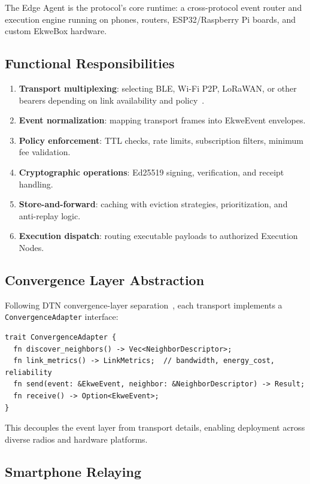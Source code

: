 \documentclass[11pt,a4paper]{article}
\begin{document}
The Edge Agent is the protocol's core runtime: a cross-protocol event router and execution engine running on phones, routers, ESP32/Raspberry Pi boards, and custom EkweBox hardware.

\subsection{Functional Responsibilities}

\begin{enumerate}[nosep]
  \item \textbf{Transport multiplexing}: selecting BLE, Wi-Fi P2P, LoRaWAN, or other bearers depending on link availability and policy~\cite{wifi_p2p}.
  \item \textbf{Event normalization}: mapping transport frames into EkweEvent envelopes.
  \item \textbf{Policy enforcement}: TTL checks, rate limits, subscription filters, minimum fee validation.
  \item \textbf{Cryptographic operations}: Ed25519 signing, verification, and receipt handling.
  \item \textbf{Store-and-forward}: caching with eviction strategies, prioritization, and anti-replay logic.
  \item \textbf{Execution dispatch}: routing executable payloads to authorized Execution Nodes.
\end{enumerate}

\subsection{Convergence Layer Abstraction}

Following DTN convergence-layer separation~\cite{rfc4838}, each transport implements a \texttt{ConvergenceAdapter} interface:

\begin{lstlisting}[caption={Convergence Adapter interface.}]
trait ConvergenceAdapter {
  fn discover_neighbors() -> Vec<NeighborDescriptor>;
  fn link_metrics() -> LinkMetrics;  // bandwidth, energy_cost, reliability
  fn send(event: &EkweEvent, neighbor: &NeighborDescriptor) -> Result;
  fn receive() -> Option<EkweEvent>;
}
\end{lstlisting}

This decouples the event layer from transport details, enabling deployment across diverse radios and hardware platforms.

\subsection{Smartphone Relaying}
\end{document}
